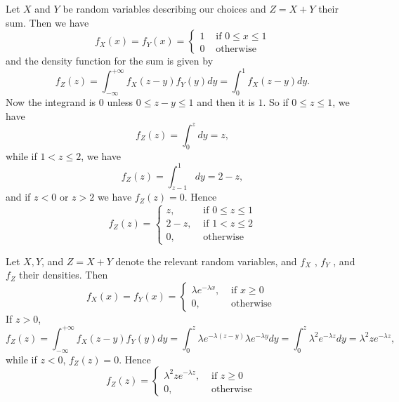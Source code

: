 \begin{example}
Let $X$ and $Y$ be random variables describing our choices and $Z = X + Y$ their sum. Then we have
\begin{equation*}
    f_{X}(x)=f_{Y}(x)=\left\{\begin{array}{ll}{1} & {\text { if } 0 \leq x \leq 1} \\ {0} & {\text { otherwise }}\end{array}\right.
\end{equation*}
and the density function for the sum is given by
\begin{equation*}
    f_{Z}(z)=\int_{-\infty}^{+\infty} f_{X}(z-y) f_{Y}(y) d y = \int_{0}^{1} f_{X}(z-y) d y.
\end{equation*}
Now the integrand is $0$ unless $0 \leq z-y \leq 1$ and then it is $1$. So if $0 \leq z \leq 1$, we have 
\begin{equation*}
    f_{Z}(z)=\int_{0}^{z} d y=z,
\end{equation*}
while if $1 < z \leq 2$, we have
\begin{equation*}
    f_{Z}(z)=\int_{z-1}^{1} d y=2-z, 
\end{equation*}
and if $z < 0$ or $z > 2$ we have $f_Z(z) = 0$. Hence
\begin{equation*}
    f_{Z}(z)=\left\{\begin{array}{ll}{z,} & {\text { if } 0 \leq z \leq 1} \\ {2-z,} & {\text { if } 1<z \leq 2} \\ {0,} & {\text { otherwise }}\end{array}\right.
\end{equation*}
\end{example}

\begin{example}
Let $X, Y$, and $Z = X + Y$ denote the relevant random variables, and $f_X$ , $f_Y$ , and $f_Z$ their densities. Then
\begin{equation*}
    f_{X}(x)=f_{Y}(x)=\left\{\begin{array}{ll}{\lambda e^{-\lambda x},} & {\text { if } x \geq 0} \\ {0,} & {\text { otherwise }}\end{array}\right.
\end{equation*}
If $z > 0$,
\begin{equation*}
    f_{Z}(z)=\int_{-\infty}^{+\infty} f_{X}(z-y) f_{Y}(y) d y =\int_{0}^{z} \lambda e^{-\lambda(z-y)} \lambda e^{-\lambda y} d y =\int_{0}^{z} \lambda^{2} e^{-\lambda z} d y =\lambda^{2} z e^{-\lambda z},
\end{equation*}
while if $z < 0$, $f_Z(z) = 0$. Hence 
\begin{equation*}
    f_{Z}(z)=\left\{\begin{array}{ll}{\lambda^{2} z e^{-\lambda z},} & {\text { if } z \geq 0} \\ {0,} & {\text { otherwise }}\end{array}\right.
\end{equation*}
\end{example}


